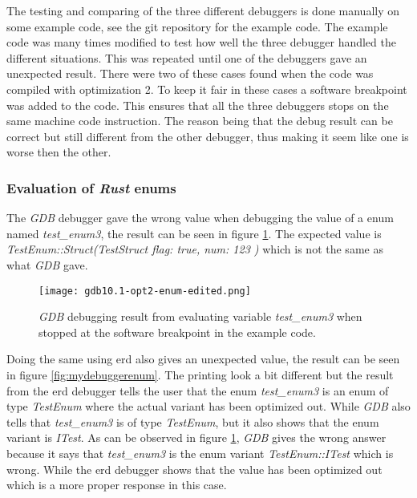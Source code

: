 %


The testing and comparing of the three different debuggers is done manually on some example code, see the git repository \cite{example-code} for the example code.
The example code was many times modified to test how well the three debugger handled the different situations.
This was repeated until one of the debuggers gave an unexpected result.
There were two of these cases found when the code was compiled with optimization 2.
To keep it fair in these cases a software breakpoint was added to the code.
This ensures that all the three debuggers stops on the same machine code instruction.
The reason being that the debug result can be correct but still different from the other debugger, thus making it seem like one is worse then the other.


\subsubsection{Evaluation of \emph{Rust} enums}
The \emph{GDB} debugger gave the wrong value when debugging the value of a enum named \emph{test\_enum3}, the result can be seen in figure \ref{fig:gdbenum}.
The expected value is \emph{TestEnum::Struct(TestStruct { flag: true, num: 123 })} which is not the same as what \emph{GDB} gave.


\begin{figure}[h]
	\centering
	\texttt{[image: gdb10.1-opt2-enum-edited.png]}
	\caption{\emph{GDB} debugging result from evaluating variable \emph{test\_enum3} when stopped at the software breakpoint in the example code.}
	\label{fig:gdbenum}
\end{figure}


Doing the same using \gls{erd} also gives an unexpected value, the result can be seen in  figure \ref{fig:mydebuggerenum}.
The printing look a bit different but the result from the \gls{erd} debugger tells the user that the enum \emph{test\_enum3} is an enum of type \emph{TestEnum} where the actual variant has been optimized out.
While \emph{GDB} also tells that \emph{test\_enum3} is of type \emph{TestEnum}, but it also shows that the enum variant is \emph{ITest}.
As can be observed in figure \ref{fig:gdbenum}, \emph{GDB} gives the wrong answer because it says that \emph{test\_enum3} is the enum variant \emph{TestEnum::ITest} which is wrong.
While the \gls{erd} debugger shows that the value has been optimized out which is a more proper response in this case.


